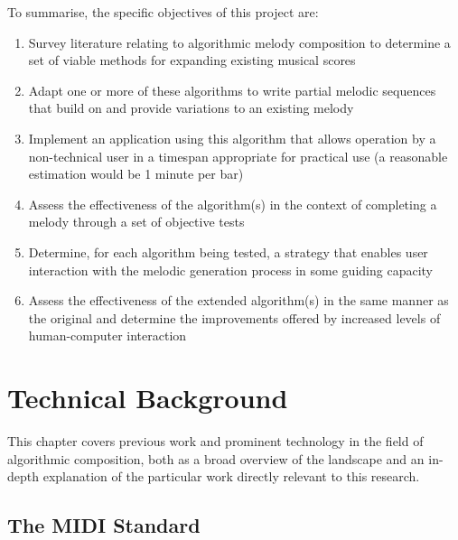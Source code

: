 \documentclass[ author={Stephen Livermore-Tozer},
				supervisor={Dr. Peter Flach},
				degree={MEng},
				title={Algorithmic Co-composition Using Machine Learning},
				subtitle={},
				type={research},
				year={2016} ]{dissertation}
\begin{document}
	To summarise, the specific objectives of this project are:
	\begin{enumerate}
		\item Survey literature relating to algorithmic melody composition to determine a set of viable methods for expanding existing musical scores
		\item Adapt one or more of these algorithms to write partial melodic sequences that build on and provide variations to an existing melody
		\item Implement an application using this algorithm that allows operation by a non-technical user in a timespan appropriate for practical use (a reasonable estimation would be 1 minute per bar)
		\item Assess the effectiveness of the algorithm(s) in the context of completing a melody through a set of objective tests
		\item Determine, for each algorithm being tested, a strategy that enables user interaction with the melodic generation process in some guiding capacity
		\item Assess the effectiveness of the extended algorithm(s) in the same manner as the original and determine the improvements offered by increased levels of human-computer interaction
	\end{enumerate}
	
	
	\chapter{Technical Background}
	\label{chap:technical}
	
	This chapter covers previous work and prominent technology in the field of algorithmic composition, both as a broad overview of the landscape and an in-depth explanation of the particular work directly relevant to this research.
	
	\section{The MIDI Standard}
	\label{sec:midi}
	
\end{document}
